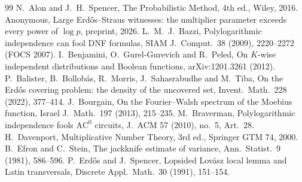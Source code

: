 \documentclass[11pt,reqno]{amsart}
\theoremstyle{definition}
\begin{document}
\begin{thebibliography}{99}
 N.~Alon and J.~H.~Spencer, The Probabilistic Method, 4th ed.,
Wiley, 2016.
 Anonymous, Large Erd\H{o}s--Straus witnesses: the multiplier
parameter exceeds every power of $\log p$, preprint, 2026.
 L.~M.~J.~Bazzi, Polylogarithmic independence can fool DNF
formulas, SIAM J.\ Comput.\ 38 (2009), 2220--2272 (FOCS 2007).
 I.~Benjamini, O.~Gurel-Gurevich and R.~Peled, On $K$-wise
independent distributions and Boolean functions, arXiv:1201.3261 (2012).
 P.~Balister, B.~Bollob\'as, R.~Morris, J.~Sahasrabudhe and
M.~Tiba, On the Erd\H{o}s covering problem: the density of the uncovered set,
Invent.\ Math.\ 228 (2022), 377--414.
 J.~Bourgain, On the Fourier--Walsh spectrum of the Moebius
function, Israel J.\ Math.\ 197 (2013), 215--235.
 M.~Braverman, Polylogarithmic independence fools
$\mathrm{AC}^0$ circuits, J.\ ACM 57 (2010), no.~5, Art.~28.
 H.~Davenport, Multiplicative Number Theory, 3rd ed., Springer GTM 74, 2000.
 B.~Efron and C.~Stein, The jackknife estimate of variance, Ann.\
Statist.\ 9 (1981), 586--596.
 P.~Erd\H{o}s and J.~Spencer, Lopsided Lov\'asz local
lemma and Latin transversals, Discrete Appl.\ Math.\ 30 (1991), 151--154.

\end{thebibliography}
\end{document}
